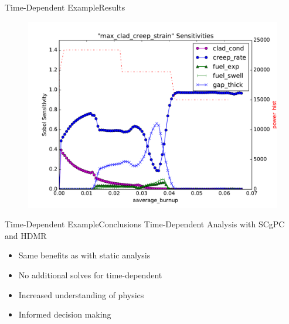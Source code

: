 \documentclass{beamer}
\begin{document}
\begin{frame}{Time-Dependent Example}{Results}\vspace{-20pt}
      \begin{figure}
        \centering
        \includegraphics[width=0.8\linewidth]{oecd/sens_max_clad_creep_strain}
      \end{figure}
\end{frame}

\begin{frame}{Time-Dependent Example}{Conclusions}\vspace{-20pt}
  \vfill
  Time-Dependent Analysis with SCgPC and HDMR
  \vfill
  \begin{itemize}
    \item Same benefits as with static analysis
  \vfill
    \item No additional solves for time-dependent
  \vfill
    \item Increased understanding of physics
  \vfill
    \item Informed decision making
  \end{itemize}
  \vfill
\end{frame}
\end{document}

